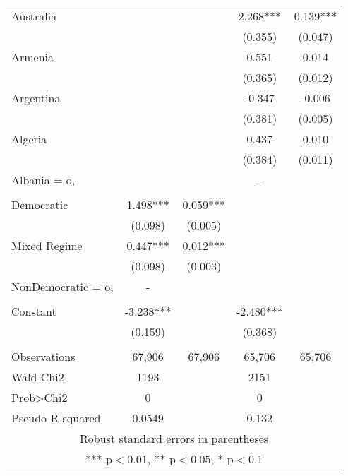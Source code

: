 \documentclass[]{article}
\begin{document}
\begin{tabular}{lcccc}
Australia &  &  & 2.268*** & 0.139*** \\
 &  &  & (0.355) & (0.047) \\
Armenia &  &  & 0.551 & 0.014 \\
 &  &  & (0.365) & (0.012) \\
Argentina &  &  & -0.347 & -0.006 \\
 &  &  & (0.381) & (0.005) \\
Algeria &  &  & 0.437 & 0.010 \\
 &  &  & (0.384) & (0.011) \\
Albania = o, &  &  & - &  \\
 &  &  &  &  \\
Democratic & 1.498*** & 0.059*** &  &  \\
 & (0.098) & (0.005) &  &  \\
Mixed Regime & 0.447*** & 0.012*** &  &  \\
 & (0.098) & (0.003) &  &  \\
NonDemocratic = o, & - &  &  &  \\
 &  &  &  &  \\
Constant & -3.238*** &  & -2.480*** &  \\
 & (0.159) &  & (0.368) &  \\
 &  &  &  &  \\
Observations & 67,906 & 67,906 & 65,706 & 65,706 \\
Wald Chi2 & 1193 &  & 2151 &  \\
Prob>Chi2 & 0 &  & 0 &  \\
 Pseudo R-squared & 0.0549 &  & 0.132 &  \\ \hline
\multicolumn{5}{c}{ Robust standard errors in parentheses} \\
\multicolumn{5}{c}{ *** p$<$0.01, ** p$<$0.05, * p$<$0.1} \\
\end{tabular}
\end{document}

